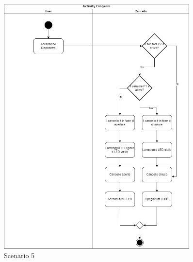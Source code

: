 \begin{figure}[H]
    \centering
    \includegraphics[width=0.9\textwidth]{figures/scenario5.drawio.png}
    \caption{Scenario 5}
    \label{scenario5}
\end{figure}